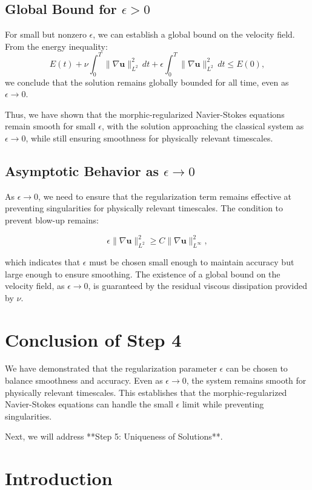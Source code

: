 \documentclass{article}
\begin{document}
\subsection*{Global Bound for \( \epsilon > 0 \)}

For small but nonzero \( \epsilon \), we can establish a global bound on the velocity field. From the energy inequality:
\[
E(t) + \nu \int_0^T \|\nabla \mathbf{u}\|_{L^2}^2 \, dt + \epsilon \int_0^T \|\nabla \mathbf{u}\|_{L^2}^2 \, dt \leq E(0),
\]
we conclude that the solution remains globally bounded for all time, even as \( \epsilon \to 0 \).

Thus, we have shown that the morphic-regularized Navier-Stokes equations remain smooth for small \( \epsilon \), with the solution approaching the classical system as \( \epsilon \to 0 \), while still ensuring smoothness for physically relevant timescales.
\
\subsection*{Asymptotic Behavior as \( \epsilon \to 0 \)}

As \( \epsilon \to 0 \), we need to ensure that the regularization term remains effective at preventing singularities for physically relevant timescales. The condition to prevent blow-up remains:

\[
\epsilon \|\nabla \mathbf{u}\|_{L^2}^2 \geq C \|\nabla \mathbf{u}\|_{L^\infty}^2,
\]

which indicates that \( \epsilon \) must be chosen small enough to maintain accuracy but large enough to ensure smoothing. The existence of a global bound on the velocity field, as \( \epsilon \to 0 \), is guaranteed by the residual viscous dissipation provided by \( \nu \).

\section{Conclusion of Step 4}

We have demonstrated that the regularization parameter \( \epsilon \) can be chosen to balance smoothness and accuracy. Even as \( \epsilon \to 0 \), the system remains smooth for physically relevant timescales. This establishes that the morphic-regularized Navier-Stokes equations can handle the small \( \epsilon \) limit while preventing singularities.

Next, we will address **Step 5: Uniqueness of Solutions**.
\section*{Introduction}
\end{document}
